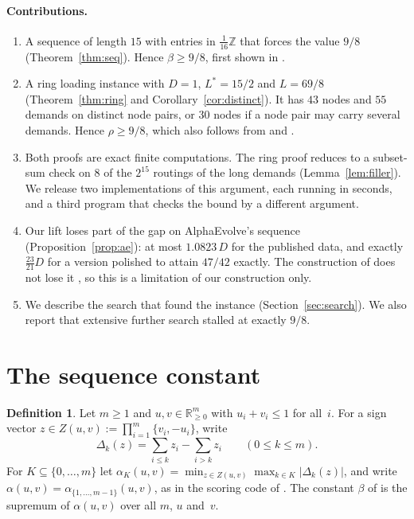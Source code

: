 \documentclass[11pt]{article}
\theoremstyle{plain}
\theoremstyle{definition}
\newtheorem{definition}[theorem]{Definition}
\theoremstyle{remark}
\begin{document}
\paragraph{Contributions.}
\begin{enumerate}[label=(\arabic*),leftmargin=*]
\item A sequence of length $15$ with entries in $\tfrac1{16}\mathbb{Z}$ that forces the value $9/8$ (Theorem~\ref{thm:seq}). Hence $\beta\ge 9/8$, first shown in \cite{Mak26}.
\item A ring loading instance with $D=1$, $L^*=15/2$ and $L=69/8$ (Theorem~\ref{thm:ring} and Corollary~\ref{cor:distinct}). It has $43$ nodes and $55$ demands on distinct node pairs, or $30$ nodes if a node pair may carry several demands. Hence $\rho\ge 9/8$, which also follows from \cite{Mak26} and \cite[Lemma~7]{Dau22}.
\item Both proofs are exact finite computations. The ring proof reduces to a subset-sum check on $8$ of the $2^{15}$ routings of the long demands (Lemma~\ref{lem:filler}). We release two implementations of this argument, each running in seconds, and a third program that checks the bound by a different argument.
\item Our lift loses part of the gap on AlphaEvolve's sequence (Proposition~\ref{prop:ae}): at most $1.0823\,D$ for the published data, and exactly $\tfrac{23}{21}D$ for a version polished to attain $47/42$ exactly. The construction of \cite[Lemma~7]{Dau22} does not lose it \cite{Roz26}, so this is a limitation of our construction only.
\item We describe the search that found the instance (Section~\ref{sec:search}). We also report that extensive further search stalled at exactly $9/8$.
\end{enumerate}

\section{The sequence constant}\label{sec:seq}

\begin{definition}
Let $m\ge1$ and $u,v\in\mathbb{R}^m_{\ge0}$ with $u_i+v_i\le1$ for all~$i$.
For a sign vector $z\in Z(u,v):=\prod_{i=1}^m\{v_i,-u_i\}$, write
\[
\Delta_k(z)=\sum_{i\le k}z_i-\sum_{i>k}z_i\qquad(0\le k\le m).
\]
For $K\subseteq\{0,\dots,m\}$ let $\alpha_K(u,v)=\min_{z\in Z(u,v)}\max_{k\in K}|\Delta_k(z)|$, and write $\alpha(u,v)=\alpha_{\{1,\dots,m-1\}}(u,v)$, as in the scoring code of \cite{GGTW25,AERepo}.
The constant $\beta$ of \cite{SSW98} is the supremum of $\alpha(u,v)$ over all $m$, $u$ and~$v$.
\end{definition}
\end{document}

